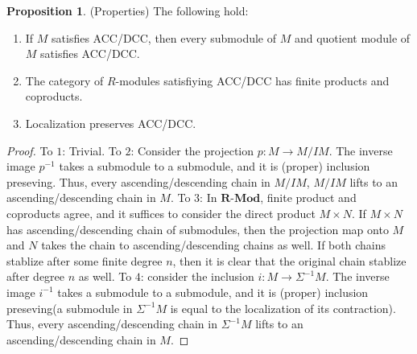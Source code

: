 \documentclass{article}
\theoremstyle{definition}
\theoremstyle{definition}
\theoremstyle{definition}
\newtheorem{proposition}{Proposition}[section]
\theoremstyle{definition}
\theoremstyle{definition}
\theoremstyle{definition}
\theoremstyle{definition}
\begin{document}
\begin{tcolorbox}[colback=blue!5!white,colframe=blue!30!white]
\begin{proposition}
(Properties) The following hold:
\begin{enumerate}
    \item If $M$ satisfies ACC/DCC, then every submodule of $M$ and quotient module of $M$ satisfies ACC/DCC.
    \item The category of $R$-modules satisfiying ACC/DCC has finite products and coproducts. 
    \item Localization preserves ACC/DCC. 
 \end{enumerate}
\end{proposition}
\end{tcolorbox}
\begin{proof}
    To $1$: Trivial.
    To $2$: Consider the projection $p: M\to M/IM$. The inverse image $p^{-1}$ takes a submodule to a submodule, and it is (proper) inclusion preseving. Thus, every ascending/descending chain in $M/IM$, $M/IM$ lifts to an ascending/descending chain in $M$.  
    To $3$: In $\textbf{R-Mod}$, finite product and coproducts agree, and it suffices to consider the direct product $M\times N$. If $M\times N$ has ascending/descending chain of submodules, then the projection map onto $M$ and $N$ takes the chain to ascending/descending chains as well. If both chains stablize after some finite degree $n$, then it is clear that the original chain stablize after degree $n$ as well.
    To $4$: consider the inclusion $i: M\to \Sigma ^{-1}M$. The inverse image $i^{-1}$ takes a submodule to a submodule, and it is (proper) inclusion preseving(a submodule in $\Sigma ^{-1}M$ is equal to the localization of its contraction). Thus, every ascending/descending chain in $\Sigma ^{-1}M$ lifts to an ascending/descending chain in $M$. 
\end{proof}
\end{document}
